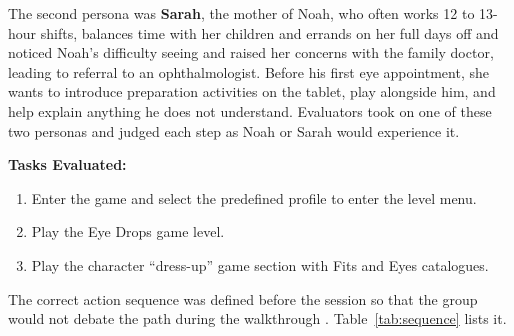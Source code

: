 \documentclass{article}
\begin{document}
The second persona was \textbf{Sarah}, the mother of Noah, who often works 12 to 13-hour shifts, 
balances time with her children and errands on her full days off and noticed Noah's difficulty 
seeing and raised her concerns with the family doctor, leading to referral to an ophthalmologist. 
Before his first eye appointment, she wants to introduce preparation activities on the tablet, 
play alongside him, and help explain anything he does not understand. Evaluators took on one of 
these two personas and judged each step as Noah or Sarah would experience it. 

\textbf{Tasks Evaluated:}
\begin{enumerate}
    \item Enter the game and select the predefined profile to enter the level menu.
    \item Play the Eye Drops game level.
    \item Play the character ``dress-up'' game section with Fits and Eyes catalogues.
\end{enumerate}

The correct action sequence was defined before the session so that the group would not debate 
the path during the walkthrough \cite{nng-workshop}. Table~\ref{tab:sequence} lists it.
\end{document}
